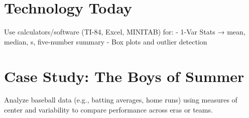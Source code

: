 \documentclass{article}
\theoremstyle{definition}
\begin{document}
	\section{Technology Today}
	
	Use calculators/software (TI-84, Excel, MINITAB) for:
	- 1-Var Stats → mean, median, s, five-number summary
	- Box plots and outlier detection
	
	\section{Case Study: The Boys of Summer}
	
	Analyze baseball data (e.g., batting averages, home runs) using measures of center and variability to compare performance across eras or teams.
	
\end{document}
